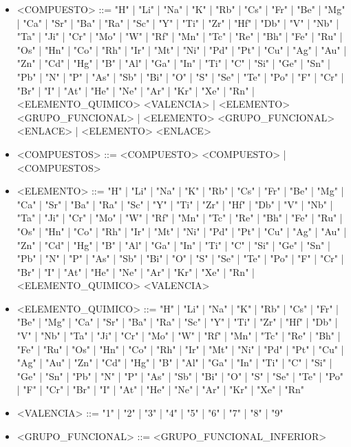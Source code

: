 \begin{itemize}
    \item <COMPUESTO> ::= "H" | "Li" | "Na" | "K" | "Rb" | "Cs" | "Fr" | "Be" | "Mg" | "Ca" | "Sr" | "Ba" | "Ra" | "Sc" | "Y" | "Ti" | "Zr" | "Hf" | "Db" | "V" | "Nb" | "Ta" | "Ji" | "Cr" | "Mo" | "W" | "Rf" | "Mn" | "Tc" | "Re" | "Bh" | "Fe" | "Ru" | "Os" | "Hn" | "Co" | "Rh" | "Ir" | "Mt" | "Ni" | "Pd" | "Pt" | "Cu" | "Ag" | "Au" | "Zn" | "Cd" | "Hg" | "B" | "Al" | "Ga" | "In" | "Ti" | "C" | "Si" | "Ge" | "Sn" | "Pb" | "N" | "P" | "As" | "Sb" | "Bi" | "O" | "S" | "Se" | "Te" | "Po" | "F" | "Cr" | "Br" | "I" | "At" | "He" | "Ne" | "Ar" | "Kr" | "Xe" | "Rn" | <ELEMENTO\_QUIMICO> <VALENCIA> | <ELEMENTO> <GRUPO\_FUNCIONAL> | <ELEMENTO> <GRUPO\_FUNCIONAL> <ENLACE> | <ELEMENTO> <ENLACE>
    \item <COMPUESTOS> ::= <COMPUESTO> <COMPUESTO> | <COMPUESTOS>
    \item <ELEMENTO> ::= "H" | "Li" | "Na" | "K" | "Rb" | "Cs" | "Fr" | "Be" | "Mg" | "Ca" | "Sr" | "Ba" | "Ra" | "Sc" | "Y" | "Ti" | "Zr" | "Hf" | "Db" | "V" | "Nb" | "Ta" | "Ji" | "Cr" | "Mo" | "W" | "Rf" | "Mn" | "Tc" | "Re" | "Bh" | "Fe" | "Ru" | "Os" | "Hn" | "Co" | "Rh" | "Ir" | "Mt" | "Ni" | "Pd" | "Pt" | "Cu" | "Ag" | "Au" | "Zn" | "Cd" | "Hg" | "B" | "Al" | "Ga" | "In" | "Ti" | "C" | "Si" | "Ge" | "Sn" | "Pb" | "N" | "P" | "As" | "Sb" | "Bi" | "O" | "S" | "Se" | "Te" | "Po" | "F" | "Cr" | "Br" | "I" | "At" | "He" | "Ne" | "Ar" | "Kr" | "Xe" | "Rn" | <ELEMENTO\_QUIMICO> <VALENCIA>
    \item <ELEMENTO\_QUIMICO> ::= "H" | "Li" | "Na" | "K" | "Rb" | "Cs" | "Fr" | "Be" | "Mg" | "Ca" | "Sr" | "Ba" | "Ra" | "Sc" | "Y" | "Ti" | "Zr" | "Hf" | "Db" | "V" | "Nb" | "Ta" | "Ji" | "Cr" | "Mo" | "W" | "Rf" | "Mn" | "Tc" | "Re" | "Bh" | "Fe" | "Ru" | "Os" | "Hn" | "Co" | "Rh" | "Ir" | "Mt" | "Ni" | "Pd" | "Pt" | "Cu" | "Ag" | "Au" | "Zn" | "Cd" | "Hg" | "B" | "Al" | "Ga" | "In" | "Ti" | "C" | "Si" | "Ge" | "Sn" | "Pb" | "N" | "P" | "As" | "Sb" | "Bi" | "O" | "S" | "Se" | "Te" | "Po" | "F" | "Cr" | "Br" | "I" | "At" | "He" | "Ne" | "Ar" | "Kr" | "Xe" | "Rn"
    \item <VALENCIA> ::= "1" | "2" | "3" | "4" | "5" | "6" | "7" | "8" | "9"
    \item <GRUPO\_FUNCIONAL> ::=
          <GRUPO\_FUNCIONAL\_INFERIOR>


\end{itemize}
